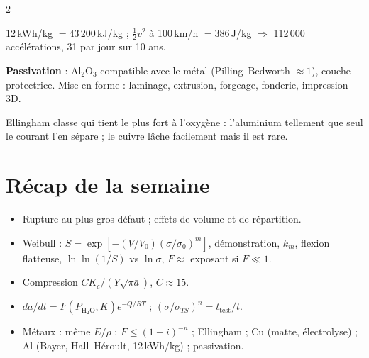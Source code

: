 \documentclass[a4paper,9pt]{extarticle}
\begin{document}
\begin{multicols}{2}
\begin{example}
$12$\,kWh/kg $= 43\,200$\,kJ/kg ; $\frac12v^2$ à 100\,km/h $= 386$\,J/kg $\Rightarrow$
112\,000 accélérations, 31 par jour sur 10 ans.
\end{example}

\begin{important}
\textbf{Passivation} : Al$_2$O$_3$ compatible avec le métal (Pilling--Bedworth $\approx 1$),
couche protectrice. Mise en forme : laminage, extrusion, forgeage, fonderie, impression 3D.
\end{important}

\begin{goat}
Ellingham classe qui tient le plus fort à l'oxygène : l'aluminium tellement que seul le courant
l'en sépare ; le cuivre lâche facilement mais il est rare.
\end{goat}

\section{Récap de la semaine}

\begin{recap}
\begin{itemize}
\item Rupture au plus gros défaut ; effets de volume et de répartition.
\item Weibull : $S = \exp[-(V/V_0)(\sigma/\sigma_0)^m]$, démonstration, $k_m$, flexion flatteuse,
      $\ln\ln(1/S)$ vs $\ln\sigma$, $F \approx$ exposant si $F \ll 1$.
\item Compression $CK_c/(Y\sqrt{\pi\bar a})$, $C \approx 15$.
\item $da/dt = F(P_{\text{H}_2\text{O}},K)e^{-Q/RT}$ ; $(\sigma/\sigma_{TS})^n = t_{\text{test}}/t$.
\item Métaux : même $E/\rho$ ; $F \le (1+i)^{-n}$ ; Ellingham ; Cu (matte, électrolyse) ;
      Al (Bayer, Hall--Héroult, 12\,kWh/kg) ; passivation.
\end{itemize}
\end{recap}

\end{multicols}
\end{document}
